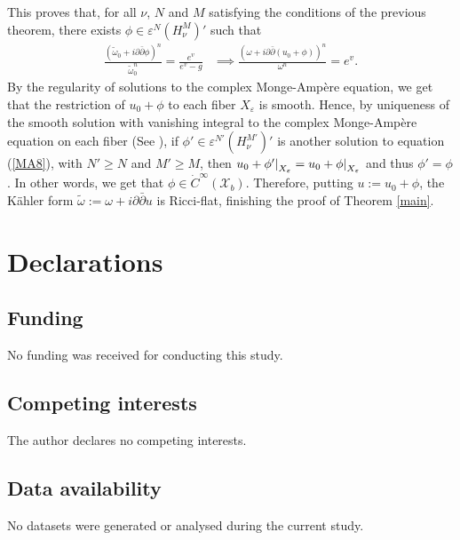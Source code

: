 \documentclass[a4paper,11pt]{article}
\newcommand\restr[2]{{%
  \left.\kern-\nulldelimiterspace %
  #1 %
  \littletaller %
  \right|_{#2} %
  }}
\newcommand{\littletaller}{\mathchoice{\vphantom{\big|}}{}{}{}}
\begin{document}
This proves that, for all $\nu$, $N$ and $M$ satisfying the conditions of the previous theorem, there exists $\phi \in \varepsilon^N \left(H_{\nu}^M \right)' $ such that  
\begin{align*}
\frac{(\tilde \omega_0 + i \partial \bar \partial \phi)^n}{\tilde \omega_0^n} = \frac{e^v}{e^{v} - g} & \implies
\frac{(\omega + i \partial \bar \partial (u_0 + \phi))^n}{\omega^n} = e^v.\end{align*} 
By the regularity of solutions to the complex Monge-Ampère equation, we get that the restriction of $u_0+ \phi$ to each fiber $X_\varepsilon$ is smooth. Hence, by uniqueness of the smooth solution with vanishing integral to the complex Monge-Ampère equation on each fiber (See \cite[Theorem 3.14, Exercise 3.16]{szekelyhidi_extremal_2014} ), if $\phi' \in \varepsilon^{N'} \left(H_{\nu}^{M'} \right)'$ is another solution to equation (\ref{MA8}), with $N' \geq N$ and $M' \geq M$, then $\restr{u_0 + \phi'}{X_\varepsilon} = \restr{u_0 + \phi}{X_\varepsilon}$ and thus $\phi' = \phi$. In other words, we get that $\phi \in \dot{C}^{\infty} (\mathcal{X}_b)$. Therefore, putting $u := u_0 + \phi$, the Kähler form $\tilde{\omega} :=\omega + i \partial \bar \partial u$ is Ricci-flat, finishing the proof of Theorem \ref{main}.

\section*{Declarations}

\subsection*{Funding}
No funding was received for conducting this study.

\subsection*{Competing interests}
The author declares no competing interests.

\subsection*{Data availability}
No datasets were generated or analysed during the current study.
\end{document}

